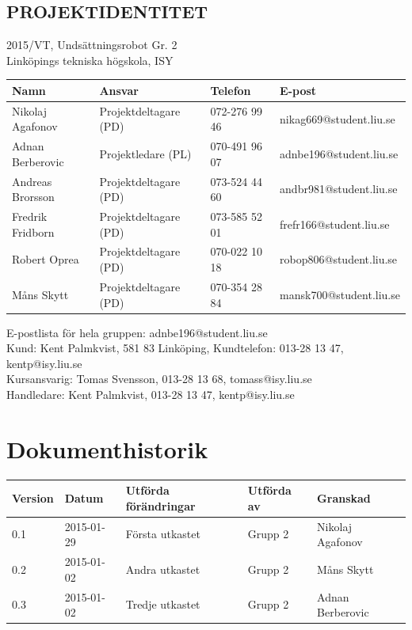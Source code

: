 \documentclass[11pt]{article}
\begin{document}
\pagebreak
\begin{center}

\section*{PROJEKTIDENTITET}
2015/VT, Undsättningsrobot Gr. 2
\\
Linköpings tekniska högskola, ISY
\\[0.5in]
\begin{table}[h]
\begin{tabular}{|l|l|l|l|} \hline
Namn & Ansvar & Telefon & E-post \\[0.1in] \hline
Nikolaj Agafonov & Projektdeltagare (PD) & 072-276 99 46 & nikag669@student.liu.se \\ \hline
Adnan Berberovic & Projektledare (PL) & 070-491 96 07 & adnbe196@student.liu.se \\ \hline
Andreas Brorsson & Projektdeltagare (PD) & 073-524 44 60 & andbr981@student.liu.se \\ \hline
Fredrik Fridborn & Projektdeltagare (PD) & 073-585 52 01 & frefr166@student.liu.se \\ \hline
Robert Oprea & Projektdeltagare (PD) & 070-022 10 18 & robop806@student.liu.se \\ \hline
Måns Skytt & Projektdeltagare (PD) & 070-354 28 84 & mansk700@student.liu.se \\ \hline
\end{tabular}
\end{table}

E-postlista för hela gruppen: adnbe196@student.liu.se
\\[1in]
Kund: Kent Palmkvist, 581 83 Linköping,
Kundtelefon: 013-28 13 47, kentp@isy.liu.se
\\[1in]
Kursansvarig: Tomas Svensson, 013-28 13 68, tomass@isy.liu.se
\\
Handledare: Kent Palmkvist, 013-28 13 47, kentp@isy.liu.se
\end{center}
\pagebreak

\tableofcontents

\pagebreak

\section*{Dokumenthistorik}
\begin{table}[h]
\begin{tabular}{|l|l|l|l|l|} \hline

Version & 
Datum & 
Utförda förändringar & 
Utförda av & 
Granskad \\[0.1in] \hline
0.1 &
2015-01-29 & 
Första utkastet & 
Grupp 2 & 
Nikolaj Agafonov \\ \hline
0.2 &
2015-01-02 &
Andra utkastet &
Grupp 2 &
Måns Skytt \\ \hline
0.3 &
2015-01-02 &
Tredje utkastet &
Grupp 2 &
Adnan Berberovic \\ \hline
\end{tabular}
\end{table}
\end{document}
